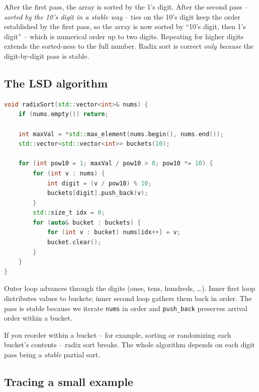 \documentclass[11pt]{article}
\begin{document}
\begin{ideabox}
After the first pass, the array is sorted by the 1's digit. After
the second pass -- \emph{sorted by the 10's digit in a stable way} --
ties on the 10's digit keep the order established by the first pass,
so the array is now sorted by ``10's digit, then 1's digit'' --
which is numerical order up to two digits. Repeating for higher
digits extends the sorted-ness to the full number. Radix sort is
correct \emph{only because} the digit-by-digit pass is stable.
\end{ideabox}

\subsection{The LSD algorithm}

\begin{examplebox}
\begin{lstlisting}[basicstyle=\ttfamily\small,frame=single,language=C++]
void radixSort(std::vector<int>& nums) {
    if (nums.empty()) return;

    int maxVal = *std::max_element(nums.begin(), nums.end());
    std::vector<std::vector<int>> buckets(10);

    for (int pow10 = 1; maxVal / pow10 > 0; pow10 *= 10) {
        for (int v : nums) {
            int digit = (v / pow10) % 10;
            buckets[digit].push_back(v);
        }
        std::size_t idx = 0;
        for (auto& bucket : buckets) {
            for (int v : bucket) nums[idx++] = v;
            bucket.clear();
        }
    }
}
\end{lstlisting}
Outer loop advances through the digits (ones, tens, hundreds, \ldots).
Inner first loop distributes values to buckets; inner second loop
gathers them back in order. The pass is stable because we iterate
\texttt{nums} in order and \texttt{push\_back} preserves arrival
order within a bucket.
\end{examplebox}

\begin{warnbox}
If you reorder within a bucket -- for example, sorting or
randomizing each bucket's contents -- radix sort breaks. The whole
algorithm depends on each digit pass being a \emph{stable} partial
sort.
\end{warnbox}

\subsection*{Tracing a small example}
\end{document}
